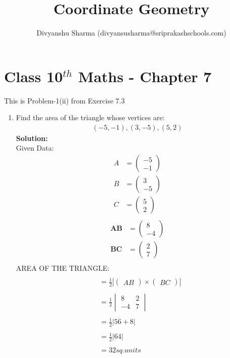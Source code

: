 \documentclass[12pt]{article}
\title{Coordinate Geometry}
\author{Divyanshu Sharma (divyansusharma@sriprakashschools.com)}
\newcommand{\mydet}[1]{\ensuremath{\begin{vmatrix}#1\end{vmatrix}}}
\newcommand{\myvec}[1]{\ensuremath{\begin{pmatrix}#1\end{pmatrix}}}
\newcommand{\solution}{\noindent \textbf{Solution: }}
\let\vec\mathbf
\begin{document}
\maketitle
\section*{Class 10$^{th}$ Maths - Chapter 7}
This is Problem-1(ii) from Exercise 7.3
\begin{enumerate}
\item Find the area of the triangle whose vertices are:
\begin{align}
{(-5,-1),(3,-5),(5,2)}
\end{align}
\solution \\
Given Data:
\begin{align}
A &= \myvec{-5\\-1}\\
B &= \myvec{3\\-5}\\
C &= \myvec{5\\2}\\
\end{align}
\begin{align}
\vec{AB} &= \myvec{8\\-4}\\
\vec{BC} &= \myvec{2\\7}\\
\end{align}
AREA OF THE TRIANGLE:
\begin{align}
\\&=\frac{1}{2}|\myvec{AB}\times \myvec{BC}|\\
\\&=\frac{1}{2}\mydet{8 & 2 \\ -4 & 7}\\
\\&=\frac{1}{2}|56 + 8|\\
\\&=\frac{1}{2}|64|\\
\\&= {32} sq.units
\end{align}
\end{enumerate}
\end{document}
